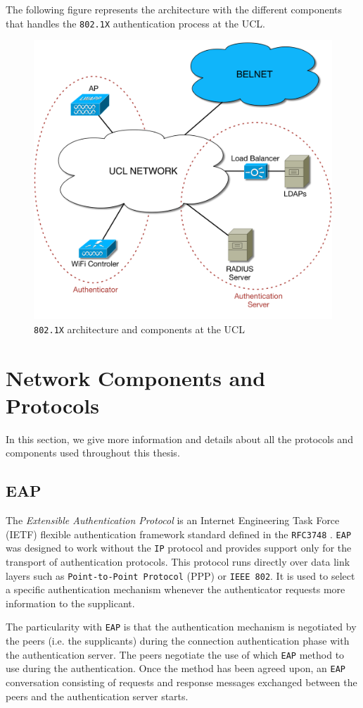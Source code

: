 The following figure represents the architecture with the different components that handles the \texttt{802.1X} authentication process at the UCL. 

\begin{figure}[H]
	\center
	\includegraphics[width=0.7\linewidth]{Pictures/chapter2/802-archi.png}
	\caption{\texttt{802.1X} architecture and components at the UCL}
\end{figure}



\section{Network Components and Protocols}
In this section, we give more information and details about all the protocols and components used throughout this thesis.

\subsection{EAP}
The \textit{Extensible Authentication Protocol} is an Internet Engineering Task Force (IETF) flexible authentication framework standard defined in the \texttt{RFC3748} \cite{rfc3748}. \texttt{EAP} was designed to work without the \texttt{IP} protocol and provides support only for the transport of authentication protocols. This protocol runs directly over data link layers such as \texttt{Point-to-Point Protocol} (PPP) or \texttt{IEEE 802}. It is used to select a specific authentication mechanism whenever the authenticator requests more information to the supplicant.

The particularity with \texttt{EAP} is that the authentication mechanism is negotiated by the peers (i.e. the supplicants) during the connection authentication phase with the authentication server. The peers negotiate the use of which \texttt{EAP} method to use during the authentication. Once the method has been agreed upon, an \texttt{EAP} conversation consisting of requests and response messages exchanged between the peers and the authentication server starts.

